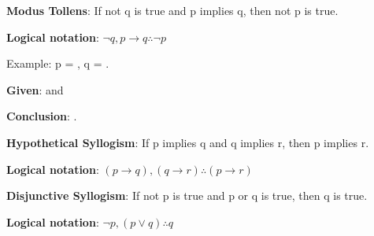 \vspace{10mm}

\textbf{Modus Tollens}: If not q is true and p implies q, then not p is true.

\textbf{Logical notation}: \(\neg q, p \rightarrow q \therefore \neg p\)

Example: p = , q = .

\textbf{Given}:  and 

\textbf{Conclusion}: .

\vspace{10 mm}

\textbf{Hypothetical Syllogism}: If p implies q and q implies r, then p implies r.

\textbf{Logical notation}: \((p \rightarrow q), (q \rightarrow r) \therefore (p \rightarrow r)\)

\vspace{10 mm}

\textbf{Disjunctive Syllogism}: If not p is true and p or q is true, then q is true.

\textbf{Logical notation}: \(\neg p, (p \vee q) \therefore q\)
